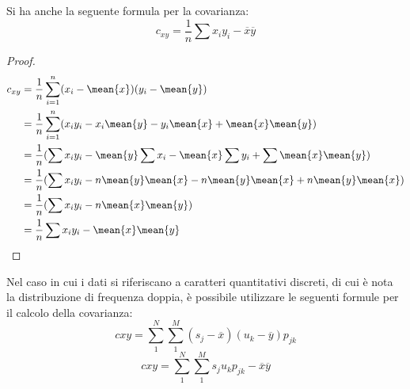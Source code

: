 \documentclass[a4paper,12pt, oneside]{book}
\begin{document}
Si ha anche la seguente formula per la covarianza:
\[ c_{xy} = \frac{1}{n} \sum x_iy_i - \overline{x}\overline{y} \]
\begin{proof}
        \[ \begin{split}
                c_{xy} & = \frac{1}{n} \sum _{i = 1} ^ n (x_i - \mean{x}) (y_i - \mean{y}) \\
                       & = \frac{1}{n} \sum _{i = 1} ^ n (x_iy_i - x_i\mean{y} - y_i \mean{x} + \mean{x}\mean{y}) \\
                       & = \frac{1}{n} (\sum x_iy_i - \mean{y} \sum x_i - \mean{x} \sum y_i + \sum \mean{x}\mean{y}) \\
                       & = \frac{1}{n} (\sum x_iy_i - n\mean{y}\mean{x} - n\mean{y}\mean{x} + n\mean{y}\mean{x}) \\
                       & = \frac{1}{n} (\sum x_iy_i - n\mean{x}\mean{y}) \\
                       & = \frac{1}{n} \sum x_iy_i - \mean{x}\mean{y} \\
            \end{split} \]
\end{proof}
Nel caso in cui i dati si riferiscano a caratteri quantitativi discreti, di cui è nota la
distribuzione di frequenza doppia, è possibile utilizzare le seguenti formule per il calcolo della covarianza:
\[ c{xy}=\sum_1^N\sum_1^M(s_j-\overline{x})(u_k-\overline{y})p_{jk} \]
\[c{xy}=\sum_1^N\sum_1^Ms_ju_kp_{jk}-\overline{x}\overline{y} \]
\end{document}
